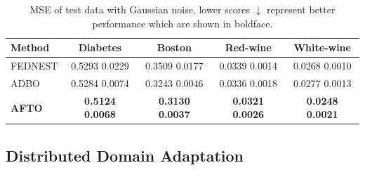 \documentclass[letterpaper]{article} %
\begin{document}
\renewcommand\arraystretch{1}
\renewcommand\tabcolsep{10pt}
\begin{table}[t]
\centering
\renewcommand{\thetable}{\arabic{table}}
{
\begin{tabular}{l|c|c|c|c}
\toprule
 Method   & Diabetes   & Boston  & Red-wine & White-wine   \\ \hline
FEDNEST  &  0.5293  0.0229 & 0.3509  0.0177 &  0.0339  0.0014  & 0.0268  0.0010  \\
ADBO  &  0.5284  0.0074 & 0.3243  0.0046 & 0.0336  0.0018 & 0.0277  0.0013  \\ \hline
\textbf{AFTO} & \textbf{0.5124}  \textbf{0.0068}  & \textbf{0.3130}  \textbf{0.0037} & \textbf{0.0321}  \textbf{0.0026} & \textbf{0.0248}  \textbf{0.0021} \\

\bottomrule
\end{tabular}}
\caption{MSE of test data with Gaussian noise, lower scores $\downarrow$ represent better performance which are shown in boldface.}
\label{tab:ADBO-ATOP}
\end{table}



\subsection{Distributed Domain Adaptation}
\end{document}
